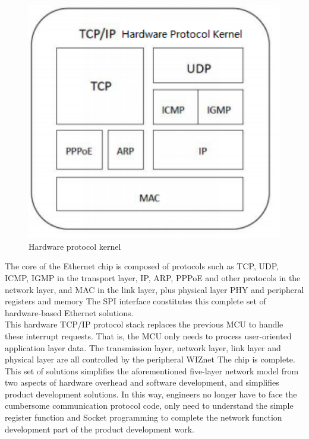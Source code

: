 \begin{figure}[!ht]
	\centering
	\includegraphics[width=13cm]{grafiken/2.9.pdf}
	\caption{Hardware protocol kernel} 
	\label{fig:2.9}
\end{figure}
\FloatBarrier
The core of the Ethernet chip is composed of protocols such as TCP, UDP, ICMP, IGMP in the transport layer, IP, ARP, PPPoE and other protocols in the network layer, and MAC in the link layer, plus physical layer PHY and peripheral registers and memory The SPI interface constitutes this complete set of hardware-based Ethernet solutions.
\\
This hardware TCP/IP protocol stack replaces the previous MCU to handle these interrupt requests. That is, the MCU only needs to process user-oriented application layer data. The transmission layer, network layer, link layer and physical layer are all controlled by the peripheral WIZnet The chip is complete. This set of solutions simplifies the aforementioned five-layer network model from two aspects of hardware overhead and software development, and simplifies product development solutions. In this way, engineers no longer have to face the cumbersome communication protocol code, only need to understand the simple register function and Socket programming to complete the network function development part of the product development work.

